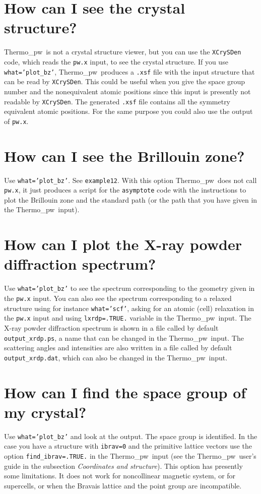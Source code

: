 \documentclass[12pt,a4paper,twoside]{report}
\def\thermo{{\sc Thermo}\_{\sc pw}}
\begin{document}
{\color{coral}\section{How can I see the crystal structure?}}
\color{black}
\thermo\ is not a crystal structure viewer, but you can use the
\texttt{XCrySDen} code, which reads the \texttt{pw.x} input, to
see the crystal structure. If you use \texttt{what='plot\_bz'}, 
\thermo\ produces a \texttt{.xsf} file with the input structure 
that can be read by \texttt{XCrySDen}. This could
be useful when you give the space group number and the nonequivalent
atomic positions since this input is presently not readable by 
\texttt{XCrySDen}.
The generated \texttt{.xsf} file contains all the symmetry equivalent 
atomic positions. For the same purpose you could also use the output
of \texttt{pw.x}.

\newpage

{\color{coral}\section{How can I see the Brillouin zone?}}
\color{black}
Use \texttt{what='plot\_bz'}. See \texttt{example12}. With this option
\thermo\ does not call \texttt{pw.x}, it just produces a script for
the \texttt{asymptote} code with the instructions to plot the Brillouin
zone and the standard path (or the path that you have given in the \thermo\ 
input). 

\newpage

{\color{coral}\section{How can I plot the X-ray powder diffraction spectrum?}}
\color{black}
Use \texttt{what='plot\_bz'} to see the spectrum corresponding to
the geometry given in the \texttt{pw.x} input. You can also see the
spectrum corresponding to a relaxed structure using for instance
\texttt{what='scf'}, asking for an atomic (cell) relaxation in the \texttt{pw.x}
input and using \texttt{lxrdp=.TRUE.} variable in the \thermo\ input.
The X-ray powder diffraction spectrum is shown in a file called by default
\texttt{output\_xrdp.ps}, a name that can be changed
in the \thermo\ input. The scattering angles and intensities
are also written in a file called by default \texttt{output\_xrdp.dat}, 
which can also be changed in the \thermo\ input.

\newpage
{\color{coral}\section{How can I find the space group of my crystal?}}
\color{black}
Use \texttt{what='plot\_bz'} and look at the output. The space group is
identified. In the case you have a structure with \texttt{ibrav=0} and
the primitive lattice vectors use the option \texttt{find\_ibrav=.TRUE.} 
in the \thermo\ input (see the \thermo\ user's guide 
in the subsection
{\it Coordinates and structure}). This option has presently some limitations.
It does not work for noncollinear magnetic system, or for supercells, or
when the Bravais lattice and the point group are incompatible.
\end{document}
